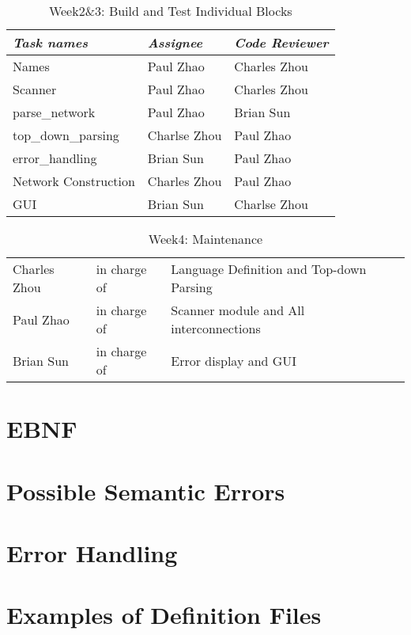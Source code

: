\documentclass[12pt]{article}
\begin{document}
\begin{table}[H]
\begin{tabular}{p{5cm}p{4cm}p{3cm}} 
\textit{Task names} & \textit{Assignee} & \textit{Code Reviewer}\\
\hline
Names & Paul Zhao & Charles Zhou\\
Scanner & Paul Zhao & Charles Zhou\\
parse\_network & Paul Zhao & Brian Sun\\
top\_down\_parsing & Charlse Zhou & Paul Zhao\\
error\_handling & Brian Sun & Paul Zhao\\
Network Construction & Charles Zhou & Paul Zhao\\
GUI & Brian Sun & Charlse Zhou\\
\end{tabular}
\caption{Week2\&3: Build and Test Individual Blocks}
\end{table}

\begin{table}[H]
\begin{tabular}{p{3cm}p{4cm}p{8cm}} 
Charles Zhou & in charge of & Language Definition and Top-down Parsing\\
Paul Zhao & in charge of & Scanner module and All interconnections\\
Brian Sun & in charge of & Error display and GUI\\
\end{tabular}
\caption{Week4: Maintenance}
\end{table}

\section{EBNF}
\section{Possible Semantic Errors}
\section{Error Handling}
\section{Examples of Definition Files}
\end{document}

